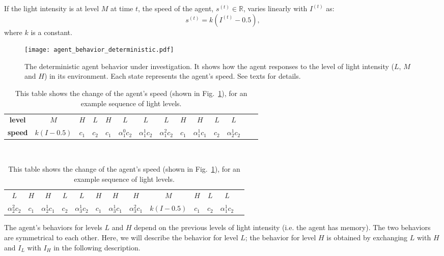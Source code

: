 If the light intensity is at level $M$ at time $t$, the speed of the agent, $s^{\left(t\right)}\in\mathbb{R}$, varies linearly with $I^{\left(t\right)}$ as: 
\begin{equation}\label{eq:agent_behavior_linear_response}
s^{\left(t\right)}=k\left(I^{\left(t\right)}-0.5\right),
\end{equation}
where $k$ is a constant.

\begin{figure}[!t]
    \centering
    \texttt{[image: agent\_behavior\_deterministic.pdf]}
    \caption{The deterministic agent behavior under investigation. It shows how the agent responses to the level of light intensity ($L$, $M$ and $H$) in its environment. Each state represents the agent's speed. See texts for details.}
    \label{fig:agent_behavior_deterministic}
\end{figure}

\begin{table}[!t]
	\caption{\label{tab:example_sequence}This table shows the change of the agent's speed (shown in Fig.~\ref{fig:agent_behavior_deterministic}), for an example sequence of light levels.}
	\renewcommand{\arraystretch}{1.5}
	\centering
		\begin{tabular}{cccccccccccccc}
			\hline 
			\textbf{level} & $M$ & $H$ & $L$ & $H$ & $L$ & $L$ & $L$ & $H$ & $H$ & $L$ & $L$\tabularnewline
			\textbf{speed} & $k(I - 0.5)$ & $c_1$ & $c_2$ & $c_1$ & $\alpha_{1}^{0}  c_2$ & $\alpha_{1}^{1}  c_2$ & $\alpha_{1}^{2}  c_2$ & $c_1$ & $\alpha_{1}^{1}  c_1$ & $c_2$ & $\alpha_{2}^{1}  c_2$ 					\tabularnewline  %
			\hline 
		\end{tabular}\\
		\vspace{5 mm}
		\begin{tabular}{ccccccccccccc}
			\hline 
			$L$ & $H$ & $H$ & $L$ & $L$ & $H$ & $H$ & $H$ & $M$ & $H$ & $L$ & $L$\tabularnewline
			$\alpha_{2}^{2}  c_2$ & $c_1$ & $\alpha_{2}^{1}  c_1$ & $c_2$ & $\alpha_{3}^{1}  c_2$ & $c_1$  & $\alpha_{3}^{1}  c_1$ & $\alpha_{3}^{2}  c_1$ & $k(I-0.5)$ & $c_1$ & $c_2$ & $\alpha_{1}^{1} c_2$\tabularnewline
			\hline 
		\end{tabular}
\end{table}

The agent's behaviors for levels $L$ and $H$ depend on the previous levels of light intensity (i.e. the agent has memory). The two behaviors are symmetrical to each other. Here, we will describe the behavior for level $L$; the behavior for level $H$ is obtained by exchanging $L$ with $H$ and $I_L$ with $I_H$ in the following description.


